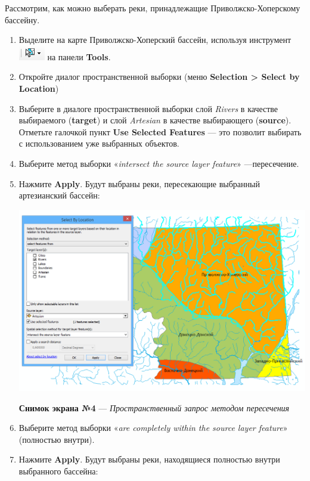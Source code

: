 \documentclass[]{book}
\theoremstyle{definition}
\theoremstyle{definition}
\theoremstyle{definition}
\theoremstyle{remark}
\begin{document}
Рассмотрим, как можно выберать реки, принадлежащие Приволжско-Хоперскому
бассейну.

\begin{enumerate}
\def\labelenumi{\arabic{enumi}.}
\item
  Выделите на карте Приволжско-Хоперский бассейн, используя инструмент
  \includegraphics{images/Ex05/image15.png} на панели \textbf{Tools}.
\item
  Откройте диалог пространственной выборки (меню \textbf{Selection
  \textgreater{} Select by Location})
\item
  Выберите в диалоге пространственной выборки слой \emph{Rivers} в
  качестве выбираемого (\textbf{target}) и слой \emph{Artesian} в
  качестве выбирающего (\textbf{source}). Отметьте галочкой пункт
  \textbf{Use Selected Features} --- это позволит выбирать с
  использованием уже выбранных объектов.
\item
  Выберите метод выборки «\emph{intersect the source layer feature}»
  ---пересечение.
\item
  Нажмите \textbf{Apply}. Будут выбраны реки, пересекающие выбранный
  артезианский бассейн:

  \includegraphics{images/Ex05/image16.png}

  \textbf{Снимок экрана №4} --- \emph{Пространственный запрос методом
  пересечения}
\item
  Выберите метод выборки «\emph{are completely within the source layer
  feature}» (полностью внутри).
\item
  Нажмите \textbf{Apply}. Будут выбраны реки, находящиеся полностью
  внутри выбранного бассейна:


\end{enumerate}
\end{document}
